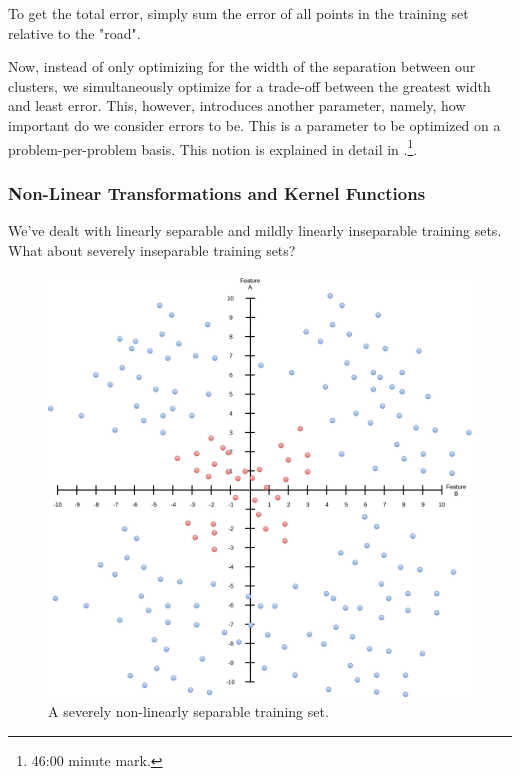 \documentclass[a4paper, 12pt]{article}
\begin{document}
                        \par To get the total error, simply sum the error of all points in the training set relative to the "road".
                        
                        \par Now, instead of only optimizing for the width of the separation between our clusters, we simultaneously optimize for a trade-off between the greatest width and least error. This, however, introduces another parameter, namely, how important do we consider errors to be. This is a parameter to be optimized on a problem-per-problem basis. This notion is explained in detail in \cite{kernelMethods}.\footnote{46:00 minute mark.}.
                        
                    \newpage
                        
                    \subsubsection{Non-Linear Transformations and Kernel Functions}
                    
                        \par We've dealt with linearly separable and mildly linearly inseparable training sets. What about severely inseparable training sets?
                        
                        \begin{figure}[h]
                            \caption{A severely non-linearly separable training set.}
                            \centering
                            \includegraphics[width=\textwidth]{preTransformationSpace}
                        \end{figure} 
                        
\end{document}

